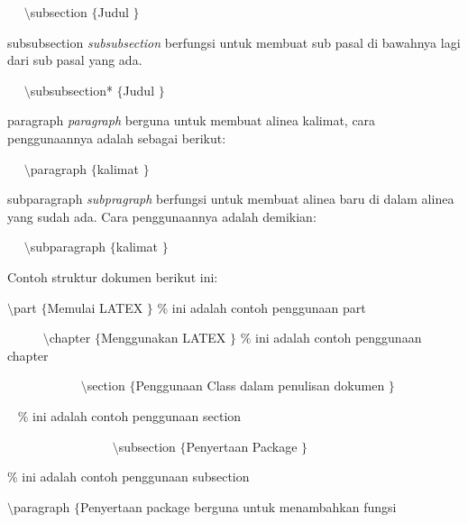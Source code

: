  \par
{\fontsize{10pt}{10pt}\selectfont ~~  $  \setminus  $subsection $  \{  $Judul $  \}  $}
 \par
subsubsection \textit{subsubsection} berfungsi untuk membuat sub pasal di bawahnya lagi dari sub pasal yang ada.
 \par
{\fontsize{10pt}{10pt}\selectfont ~~  $  \setminus  $subsubsection* $  \{  $Judul $  \}  $}
 \par
 paragraph \textit{paragraph} berguna untuk membuat alinea kalimat, cara penggunaannya adalah sebagai berikut:
 \par
{\fontsize{10pt}{10pt}\selectfont ~~  $  \setminus  $paragraph $  \{  $kalimat $  \}  $}
 \par
subparagraph \textit{subpragraph} berfungsi untuk membuat alinea baru di dalam alinea yang sudah ada. Cara penggunaannya adalah demikian:
 \par
{\fontsize{10pt}{10pt}\selectfont ~~  $  \setminus  $subparagraph $  \{  $kalimat $  \}  $}
 \par
\vspace{10pt}
Contoh struktur dokumen berikut ini:
 \par
{\fontsize{10pt}{10pt}\selectfont  $  \setminus  $part $  \{  $Memulai LATEX $  \}  $  $  \%  $ ini adalah contoh penggunaan part}
 \par
{\fontsize{10pt}{10pt}\selectfont ~~~~~  $  \setminus  $chapter $  \{  $Menggunakan LATEX $  \}  $  $  \%  $ ini adalah contoh penggunaan chapter}
 \par
{\fontsize{10pt}{10pt}\selectfont ~~~~~~~~~~~  $  \setminus  $section $  \{  $Penggunaan Class dalam penulisan dokumen $  \}  $}
 \par
{\fontsize{10pt}{10pt}\selectfont  \hspace*{0.64in} ~  \hspace*{0.64in}  \hspace*{0.64in}  $  \%  $ ini adalah contoh penggunaan section}
 \par
{\fontsize{10pt}{10pt}\selectfont ~~~~~~~~~~~~~~~~ $  \setminus  $subsection $  \{  $Penyertaan Package $  \}  $  }
 \par
{\fontsize{10pt}{10pt}\selectfont  \hspace*{0.64in}  \hspace*{0.64in}  \hspace*{0.64in}  $  \%  $ ini adalah contoh penggunaan subsection}
 \par
{\fontsize{10pt}{10pt}\selectfont  \hspace*{0.64in}  \hspace*{0.64in}  \hspace*{0.64in}  $  \setminus  $paragraph $  \{  $Penyertaan package berguna untuk menambahkan fungsi }
